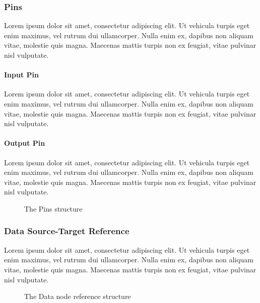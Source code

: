 \subsubsection*{Pins}\label{ssec:pins}

Lorem ipsum dolor sit amet, consectetur adipiscing elit. Ut vehicula turpis eget enim maximus, vel rutrum dui ullamcorper. Nulla enim ex, dapibus non aliquam vitae, molestie quis magna. Maecenas mattis turpis non ex feugiat, vitae pulvinar nisl vulputate.

\paragraph{Input Pin}

Lorem ipsum dolor sit amet, consectetur adipiscing elit. Ut vehicula turpis eget enim maximus, vel rutrum dui ullamcorper. Nulla enim ex, dapibus non aliquam vitae, molestie quis magna. Maecenas mattis turpis non ex feugiat, vitae pulvinar nisl vulputate.

\paragraph{Output Pin}

Lorem ipsum dolor sit amet, consectetur adipiscing elit. Ut vehicula turpis eget enim maximus, vel rutrum dui ullamcorper. Nulla enim ex, dapibus non aliquam vitae, molestie quis magna. Maecenas mattis turpis non ex feugiat, vitae pulvinar nisl vulputate.

\begin{figure}[!ht]
	\centering
	
	\caption{The Pins structure}
	\label{fig:pins}
\end{figure}

\subsubsection*{Data Source-Target Reference}

Lorem ipsum dolor sit amet, consectetur adipiscing elit. Ut vehicula turpis eget enim maximus, vel rutrum dui ullamcorper. Nulla enim ex, dapibus non aliquam vitae, molestie quis magna. Maecenas mattis turpis non ex feugiat, vitae pulvinar nisl vulputate.

\begin{figure}[!ht]
	\centering
	
	\caption{The Data node reference structure}
	\label{fig:data_source_target_reference}
\end{figure}

